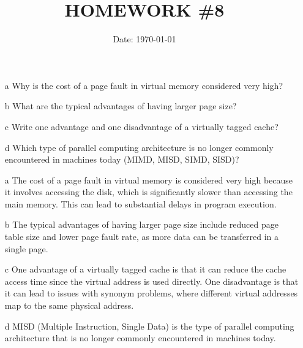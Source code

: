 \documentclass[cn,12pt]{homework}
\title{HOMEWORK \#8} %
\date{Date: \today} %
\institute{ZHEJIANG UNIVERSITY\quad COLLEGE OF INFORMATION SCIENCE AND ELECTRONICS ENGINEERING} %
\begin{document}
\maketitle



\begin{problem}


\begin{enumerate}
  \item [a] Why is the cost of a page fault in virtual memory considered very high? 
  \item [b] What are the typical advantages of having larger page size?
  \item [c] Write one advantage and one disadvantage of a virtually tagged cache?
  \item [d] Which type of parallel computing architecture is no longer commonly encountered in machines today (MIMD, MISD, SIMD, SISD)?
\end{enumerate}
\end{problem}


\begin{solution}
  \quad
  \begin{enumerate}
    \item [a] The cost of a page fault in virtual memory is considered very high because it involves accessing the disk, which is significantly slower than accessing the main memory. This can lead to substantial delays in program execution.
    \item [b] The typical advantages of having larger page size include reduced page table size and lower page fault rate, as more data can be transferred in a single page.
    \item [c] One advantage of a virtually tagged cache is that it can reduce the cache access time since the virtual address is used directly. One disadvantage is that it can lead to issues with synonym problems, where different virtual addresses map to the same physical address.
    \item [d] MISD (Multiple Instruction, Single Data) is the type of parallel computing architecture that is no longer commonly encountered in machines today.
  \end{enumerate}
\end{solution}
\end{document}
